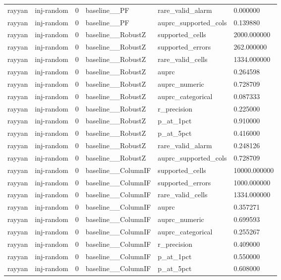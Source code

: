 \begin{tabular}{llllll}
rayyan & inj-random & 0 & baseline\_\_PF & rare\_valid\_alarm & 0.000000 \\
rayyan & inj-random & 0 & baseline\_\_PF & auprc\_supported\_cols & 0.139880 \\
rayyan & inj-random & 0 & baseline\_\_RobustZ & supported\_cells & 2000.000000 \\
rayyan & inj-random & 0 & baseline\_\_RobustZ & supported\_errors & 262.000000 \\
rayyan & inj-random & 0 & baseline\_\_RobustZ & rare\_valid\_cells & 1334.000000 \\
rayyan & inj-random & 0 & baseline\_\_RobustZ & auprc & 0.264598 \\
rayyan & inj-random & 0 & baseline\_\_RobustZ & auprc\_numeric & 0.728709 \\
rayyan & inj-random & 0 & baseline\_\_RobustZ & auprc\_categorical & 0.087333 \\
rayyan & inj-random & 0 & baseline\_\_RobustZ & r\_precision & 0.225000 \\
rayyan & inj-random & 0 & baseline\_\_RobustZ & p\_at\_1pct & 0.910000 \\
rayyan & inj-random & 0 & baseline\_\_RobustZ & p\_at\_5pct & 0.416000 \\
rayyan & inj-random & 0 & baseline\_\_RobustZ & rare\_valid\_alarm & 0.248126 \\
rayyan & inj-random & 0 & baseline\_\_RobustZ & auprc\_supported\_cols & 0.728709 \\
rayyan & inj-random & 0 & baseline\_\_ColumnIF & supported\_cells & 10000.000000 \\
rayyan & inj-random & 0 & baseline\_\_ColumnIF & supported\_errors & 1000.000000 \\
rayyan & inj-random & 0 & baseline\_\_ColumnIF & rare\_valid\_cells & 1334.000000 \\
rayyan & inj-random & 0 & baseline\_\_ColumnIF & auprc & 0.357271 \\
rayyan & inj-random & 0 & baseline\_\_ColumnIF & auprc\_numeric & 0.699593 \\
rayyan & inj-random & 0 & baseline\_\_ColumnIF & auprc\_categorical & 0.255267 \\
rayyan & inj-random & 0 & baseline\_\_ColumnIF & r\_precision & 0.409000 \\
rayyan & inj-random & 0 & baseline\_\_ColumnIF & p\_at\_1pct & 0.550000 \\
rayyan & inj-random & 0 & baseline\_\_ColumnIF & p\_at\_5pct & 0.608000 \\

\end{tabular}
